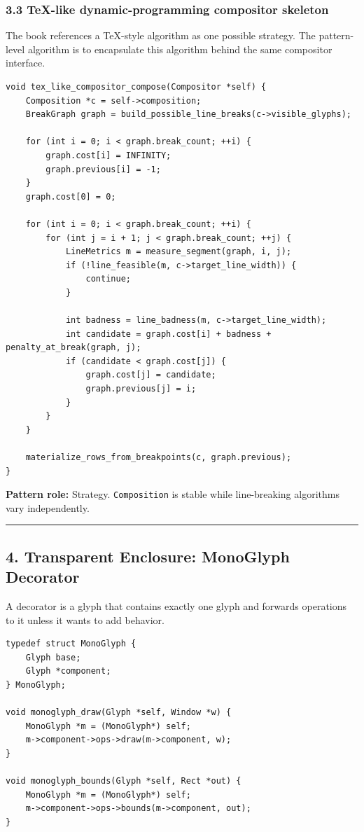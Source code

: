 \documentclass[11pt]{article}
\begin{document}
\subsubsection{3.3 TeX-like dynamic-programming compositor skeleton}\label{tex-like-dynamic-programming-compositor-skeleton}

The book references a TeX-style algorithm as one possible strategy. The pattern-level algorithm is to encapsulate this algorithm behind the same compositor interface.

\begin{verbatim}
void tex_like_compositor_compose(Compositor *self) {
    Composition *c = self->composition;
    BreakGraph graph = build_possible_line_breaks(c->visible_glyphs);

    for (int i = 0; i < graph.break_count; ++i) {
        graph.cost[i] = INFINITY;
        graph.previous[i] = -1;
    }
    graph.cost[0] = 0;

    for (int i = 0; i < graph.break_count; ++i) {
        for (int j = i + 1; j < graph.break_count; ++j) {
            LineMetrics m = measure_segment(graph, i, j);
            if (!line_feasible(m, c->target_line_width)) {
                continue;
            }

            int badness = line_badness(m, c->target_line_width);
            int candidate = graph.cost[i] + badness + penalty_at_break(graph, j);
            if (candidate < graph.cost[j]) {
                graph.cost[j] = candidate;
                graph.previous[j] = i;
            }
        }
    }

    materialize_rows_from_breakpoints(c, graph.previous);
}
\end{verbatim}

\textbf{Pattern role:} Strategy. \texttt{Composition} is stable while line-breaking algorithms vary independently.

\begin{center}\rule{0.5\linewidth}{0.5pt}\end{center}

\subsection{4. Transparent Enclosure: MonoGlyph Decorator}\label{transparent-enclosure-monoglyph-decorator}

A decorator is a glyph that contains exactly one glyph and forwards operations to it unless it wants to add behavior.

\begin{verbatim}
typedef struct MonoGlyph {
    Glyph base;
    Glyph *component;
} MonoGlyph;

void monoglyph_draw(Glyph *self, Window *w) {
    MonoGlyph *m = (MonoGlyph*) self;
    m->component->ops->draw(m->component, w);
}

void monoglyph_bounds(Glyph *self, Rect *out) {
    MonoGlyph *m = (MonoGlyph*) self;
    m->component->ops->bounds(m->component, out);
}
\end{verbatim}
\end{document}
